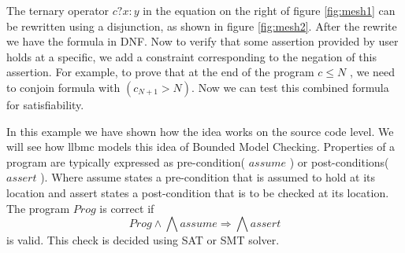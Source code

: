 \documentclass[14pt]{article}
\begin{document}
The ternary operator \(c?x:y\) in the equation on the right of figure \ref{fig:mesh1} can be rewritten using a disjunction, as shown in figure \ref{fig:mesh2}. After the rewrite we have the formula in DNF. Now to verify that some assertion provided by user holds at a specific, we add a constraint corresponding to the negation of this assertion. For example, to prove that at the end of the program \(c \leq N\) , we need to conjoin formula with \((c_{N+1}>N)\). Now we can test this combined formula for satisfiability. 

In this example we have shown how the idea works on the source code level. We will see how llbmc models this idea of Bounded Model Checking. Properties of a program are typically expressed  as pre-condition( \(assume\) ) or post-conditions( \(assert\) ). Where assume states a pre-condition that is assumed to hold at its location and assert states a post-condition that is to be checked at its location. The program  \(Prog\)  is correct if
\[Prog \wedge \bigwedge assume \Rightarrow  \bigwedge assert\]
is valid. This check is decided using SAT or SMT solver. 
\end{document}
